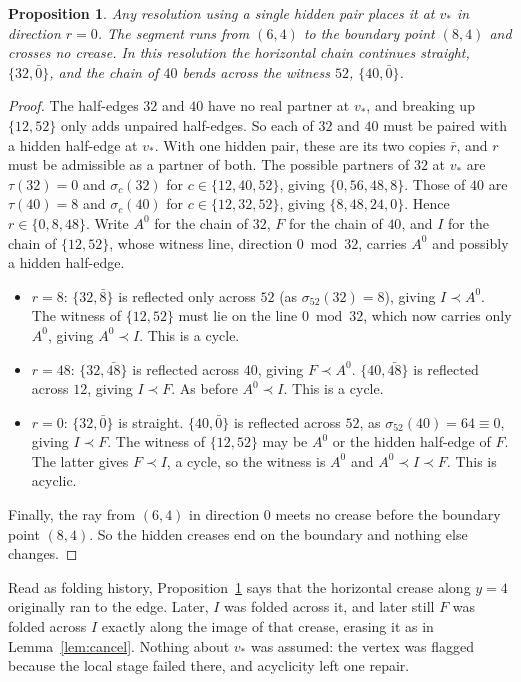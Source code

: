 \documentclass[11pt]{article}
\newtheorem{proposition}[theorem]{Proposition}
\theoremstyle{definition}
\theoremstyle{remark}
\newcommand{\vstar}{v_\ast}
\begin{document}
\begin{proposition}\label{prop:defect}
Any resolution using a single hidden pair places it at $\vstar$ in direction $r=0$. The segment runs from $(6,4)$ to the boundary point $(8,4)$ and crosses no crease. In this resolution the horizontal chain continues straight, $\{32,\bar 0\}$, and the chain of $40$ bends across the witness $52$, $\{40,\bar 0\}$.
\end{proposition}
\begin{proof}
The half-edges $32$ and $40$ have no real partner at $\vstar$, and breaking up $\{12,52\}$ only adds unpaired half-edges. So each of $32$ and $40$ must be paired with a hidden half-edge at $\vstar$. With one hidden pair, these are its two copies $\bar r$, and $r$ must be admissible as a partner of both. The possible partners of $32$ at $\vstar$ are $\tau(32)=0$ and $\sigma_c(32)$ for $c\in\{12,40,52\}$, giving $\{0,56,48,8\}$. Those of $40$ are $\tau(40)=8$ and $\sigma_c(40)$ for $c\in\{12,32,52\}$, giving $\{8,48,24,0\}$. Hence $r\in\{0,8,48\}$. Write $A^0$ for the chain of $32$, $F$ for the chain of $40$, and $I$ for the chain of $\{12,52\}$, whose witness line, direction $0\bmod 32$, carries $A^0$ and possibly a hidden half-edge.
\begin{itemize}
\item $r=8$: $\{32,\bar 8\}$ is reflected only across $52$ (as $\sigma_{52}(32)=8$), giving $I\prec A^0$. The witness of $\{12,52\}$ must lie on the line $0\bmod 32$, which now carries only $A^0$, giving $A^0\prec I$. This is a cycle.
\item $r=48$: $\{32,\bar{48}\}$ is reflected across $40$, giving $F\prec A^0$. $\{40,\bar{48}\}$ is reflected across $12$, giving $I\prec F$. As before $A^0\prec I$. This is a cycle.
\item $r=0$: $\{32,\bar 0\}$ is straight. $\{40,\bar 0\}$ is reflected across $52$, as $\sigma_{52}(40)=64\equiv 0$, giving $I\prec F$. The witness of $\{12,52\}$ may be $A^0$ or the hidden half-edge of $F$. The latter gives $F\prec I$, a cycle, so the witness is $A^0$ and $A^0\prec I\prec F$. This is acyclic.
\end{itemize}
Finally, the ray from $(6,4)$ in direction $0$ meets no crease before the boundary point $(8,4)$. So the hidden creases end on the boundary and nothing else changes.
\end{proof}

Read as folding history, Proposition~\ref{prop:defect} says that the horizontal crease along $y=4$ originally ran to the edge. Later, $I$ was folded across it, and later still $F$ was folded across $I$ exactly along the image of that crease, erasing it as in Lemma~\ref{lem:cancel}. Nothing about $\vstar$ was assumed: the vertex was flagged because the local stage failed there, and acyclicity left one repair.
\end{document}
